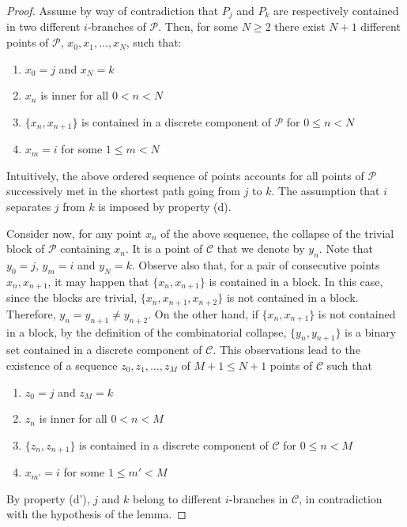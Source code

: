 \documentclass[a4paper]{amsart}
\theoremstyle{definition}
\begin{document}
\begin{proof}
Assume by way of contradiction that $P_j$ and $P_k$ are respectively contained in two different $i$-branches of $\mathcal{P}$. Then, for some $N\ge 2$ there exist $N+1$ different points of $\mathcal{P}$, $x_0,x_1,\ldots,x_N$, such that:
\begin{enumerate}
\item $x_0=j$ and $x_N=k$
\item $x_n$ is inner for all $0<n<N$
\item $\{x_n,x_{n+1}\}$ is contained in a discrete component of $\mathcal{P}$ for $0\le n<N$
\item $x_m=i$ for some $1\le m<N$
\end{enumerate}
Intuitively, the above ordered sequence of points accounts for all points of $\mathcal{P}$ successively met in the shortest path going from $j$ to $k$. The assumption that $i$ separates $j$ from $k$ is imposed by property (d).

Consider now, for any point $x_n$ of the above sequence, the collapse of the trivial block of $\mathcal{P}$ containing $x_n$. It is a point of $\mathcal{C}$ that we denote by $y_n$. Note that $y_0=j$, $y_m=i$ and $y_N=k$. Observe also that, for a pair of consecutive points $x_n,x_{n+1}$, it may happen that $\{x_n,x_{n+1}\}$ is contained in a block. In this case, since the blocks are trivial, $\{x_n,x_{n+1},x_{n+2}\}$ is not contained in a block. Therefore, $y_n=y_{n+1}\ne y_{n+2}$. On the other hand, if $\{x_n,x_{n+1}\}$ is not contained in a block, by the definition of the combinatorial collapse, $\{y_n,y_{n+1}\}$ is a binary set contained in a discrete component of $\mathcal{C}$. This observations lead to the existence of a sequence $z_0,z_1,\ldots,z_{M}$ of $M+1\le N+1$ points of $\mathcal{C}$ such that
\begin{enumerate}[(a')]
\item $z_0=j$ and $z_M=k$
\item $z_n$ is inner for all $0<n<M$
\item $\{z_n,z_{n+1}\}$ is contained in a discrete component of $\mathcal{C}$ for $0\le n<M$
\item $x_{m'}=i$ for some $1\le m'<M$
\end{enumerate}
By property (d'), $j$ and $k$ belong to different $i$-branches in $\mathcal{C}$, in contradiction with the hypothesis of the lemma.
\end{proof}
\end{document}

